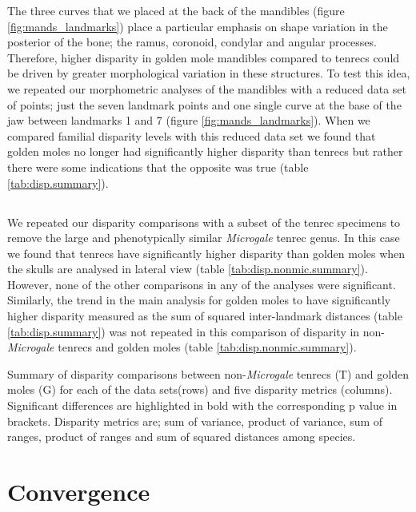 	The three curves that we placed at the back of the mandibles (figure \ref{fig:mands_landmarks}) place a particular emphasis on shape variation in the posterior of the bone; the ramus, coronoid, condylar and angular processes. Therefore, higher disparity in golden mole mandibles compared to tenrecs could be driven by greater morphological variation in these structures. To test this idea, we repeated our morphometric analyses of the mandibles with a reduced data set of points; just the seven landmark points and one single curve at the base of the jaw between landmarks 1 and 7 (figure \ref{fig:mands_landmarks}). When we compared familial disparity levels with this reduced data set we found that golden moles no longer had significantly higher disparity than tenrecs but rather there were some indications that the opposite was true (table \ref{tab:disp.summary}).
	
\subsection{}
\label{sect:nonmic_gmoles} 	   
	
	We repeated our disparity comparisons with a subset of the tenrec specimens to remove the large and phenotypically similar \textit{Microgale} tenrec genus. In this case we found that tenrecs have significantly higher disparity than golden moles when the skulls are analysed in lateral view (table \ref{tab:disp.nonmic.summary}). However, none of the other comparisons in any of the analyses were significant. Similarly, the trend in the main analysis for golden moles to have significantly higher disparity measured as the sum of squared inter-landmark distances (table \ref{tab:disp.summary}) was not repeated in this comparison of disparity in non-\textit{Microgale} tenrecs and golden moles (table \ref{tab:disp.nonmic.summary}).
\bigskip
	\begin{table}[!htb]			
	\caption[Summary of disparity comparisons between non-\textit{Microgale} tenrecs and golden moles]
		{Summary of disparity comparisons between non-\textit{Microgale} tenrecs (T) and golden moles (G) for each of the data sets(rows) and five disparity metrics (columns). Significant differences are highlighted in bold with the corresponding p value in brackets. Disparity metrics are; sum of variance, product of variance, sum of ranges, product of ranges and sum of squared distances among species. }
	\centering
	 
	\label{tab:disp.nonmic.summary}  
	\end{table}



\section{Convergence}





